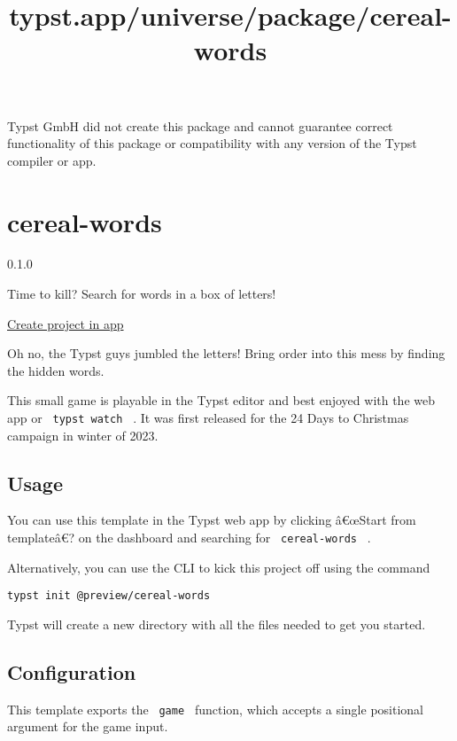 Typst GmbH did not create this package and cannot guarantee correct
functionality of this package or compatibility with any version of the
Typst compiler or app.


\title{typst.app/universe/package/cereal-words}

\label{banner}
\label{template-thumbnail}

\section{cereal-words}\label{cereal-words}

{ 0.1.0 }

Time to kill? Search for words in a box of letters!

\href{/app?template=cereal-words&version=0.1.0}{Create project in app}

\label{readme}
Oh no, the Typst guys jumbled the letters! Bring order into this mess by
finding the hidden words.

This small game is playable in the Typst editor and best enjoyed with
the web app or \texttt{\ typst\ watch\ } . It was first released for the
24 Days to Christmas campaign in winter of 2023.

\subsection{Usage}\label{usage}

You can use this template in the Typst web app by clicking â€œStart from
templateâ€? on the dashboard and searching for \texttt{\ cereal-words\ }
.

Alternatively, you can use the CLI to kick this project off using the
command

\begin{verbatim}
typst init @preview/cereal-words
\end{verbatim}

Typst will create a new directory with all the files needed to get you
started.

\subsection{Configuration}\label{configuration}

This template exports the \texttt{\ game\ } function, which accepts a
single positional argument for the game input.

